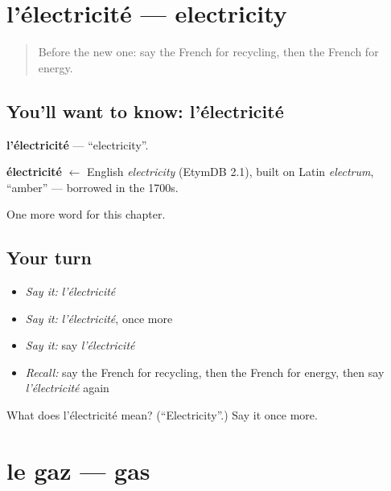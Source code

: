 \section[l'électricité]{l'électricité — electricity}

\label{lesson:FR-C255-electricite}



\begin{quote}
Before the new one: say the French for recycling, then the French for energy.
\end{quote}

\subsection*{You'll want to know: l'électricité}
\textbf{l'électricité} — \textquotedblleft{}electricity\textquotedblright{}.

\begin{cousinweb}
\textbf{électricité} $\leftarrow$ English \emph{electricity} (EtymDB 2.1), built on Latin \emph{electrum}, \textquotedblleft{}amber\textquotedblright{} — borrowed in the 1700s.
\end{cousinweb}

\begin{grammarlens}[title={What you've built}]
One more word for this chapter.
\end{grammarlens}

\subsection*{Your turn}
\begin{itemize}
\raggedright
  \item \emph{Say it:} \emph{l'électricité}
  \item \emph{Say it:} \emph{l'électricité}, once more
  \item \emph{Say it:} say \emph{l'électricité}
  \item \emph{Recall:} say the French for recycling, then the French for energy, then say \emph{l'électricité} again
\end{itemize}

\begin{tcolorbox}[breakable,colback=teal!4,colframe=teal!35!black,title={Before you move on}]
What does l'électricité mean? (\textquotedblleft{}Electricity\textquotedblright{}.) Say it once more.
\end{tcolorbox}
\section[le gaz]{le gaz — gas}

